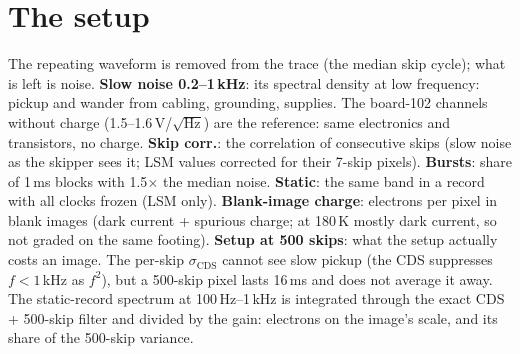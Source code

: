 \documentclass[10pt]{article}
\newcommand{\what}[1]{\par\colorbox{boxbg}{\parbox{\dimexpr\linewidth-2\fboxsep}{\small #1}}\par}
\begin{document}
\section{The setup}
\what{The repeating waveform is removed from the trace (the median skip cycle); what is left is noise.
\textbf{Slow noise 0.2--1\,kHz}: its spectral density at low frequency: pickup and wander from cabling, grounding,
supplies. The board-102 channels without charge (1.5--1.6\,\textmu V/$\sqrt{\text{Hz}}$) are the reference: same electronics
and transistors, no charge. \textbf{Skip corr.}: the correlation
of consecutive skips (slow noise as the skipper sees it; LSM values corrected for their 7-skip pixels).
\textbf{Bursts}: share of 1\,ms blocks with 1.5$\times$ the median noise. \textbf{Static}: the same band in a record with
all clocks frozen (LSM only). \textbf{Blank-image charge}: electrons per pixel in blank images (dark current + spurious
charge; at 180\,K mostly dark current, so not graded on the same footing). \textbf{Setup at 500 skips}: what the
setup actually costs an image. The per-skip $\sigma_\text{CDS}$ cannot see slow pickup (the CDS suppresses
$f<1$\,kHz as $f^2$), but a 500-skip pixel lasts 16\,ms and does not average it away. The static-record spectrum at
100\,Hz--1\,kHz is integrated through the exact CDS + 500-skip filter and divided by the gain: electrons on the image's
scale, and its share of the 500-skip variance.}


\end{document}
